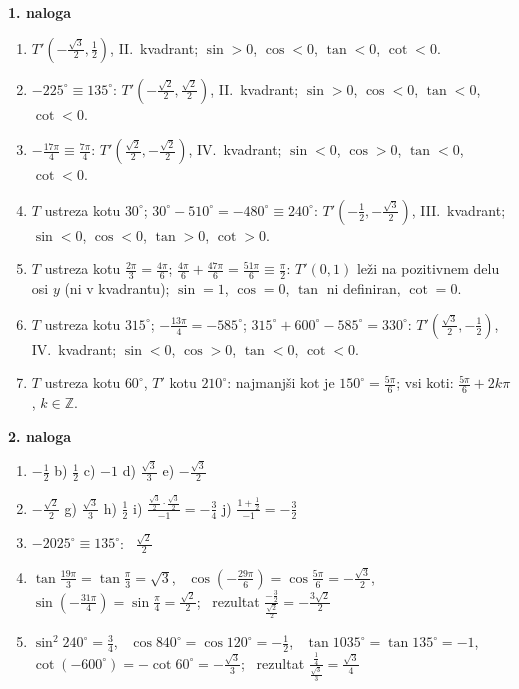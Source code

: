 \documentclass[11pt,a4paper]{article}
\begin{document}
\textbf{1. naloga}
\begin{enumerate}[label=\alph*)]
  \item $T'\!\left(-\frac{\sqrt3}{2}, \frac12\right)$, II.\ kvadrant; $\sin>0$, $\cos<0$, $\tan<0$, $\cot<0$.
  \item $-225^\circ \equiv 135^\circ$: $T'\!\left(-\frac{\sqrt2}{2}, \frac{\sqrt2}{2}\right)$, II.\ kvadrant; $\sin>0$, $\cos<0$, $\tan<0$, $\cot<0$.
  \item $-\frac{17\pi}{4} \equiv \frac{7\pi}{4}$: $T'\!\left(\frac{\sqrt2}{2}, -\frac{\sqrt2}{2}\right)$, IV.\ kvadrant; $\sin<0$, $\cos>0$, $\tan<0$, $\cot<0$.
  \item $T$ ustreza kotu $30^\circ$; $30^\circ - 510^\circ = -480^\circ \equiv 240^\circ$:
        $T'\!\left(-\frac12, -\frac{\sqrt3}{2}\right)$, III.\ kvadrant; $\sin<0$, $\cos<0$, $\tan>0$, $\cot>0$.
  \item $T$ ustreza kotu $\frac{2\pi}{3}=\frac{4\pi}{6}$; $\frac{4\pi}{6}+\frac{47\pi}{6} = \frac{51\pi}{6} \equiv \frac{\pi}{2}$:
        $T'(0,1)$ leži na pozitivnem delu osi $y$ (ni v kvadrantu); $\sin=1$, $\cos=0$, $\tan$ ni definiran, $\cot=0$.
  \item $T$ ustreza kotu $315^\circ$; $-\frac{13\pi}{4} = -585^\circ$; $315^\circ+600^\circ-585^\circ = 330^\circ$:
        $T'\!\left(\frac{\sqrt3}{2}, -\frac12\right)$, IV.\ kvadrant; $\sin<0$, $\cos>0$, $\tan<0$, $\cot<0$.
  \item $T$ ustreza kotu $60^\circ$, $T'$ kotu $210^\circ$: najmanjši kot je $150^\circ = \frac{5\pi}{6}$;
        vsi koti: $\frac{5\pi}{6} + 2k\pi$, $k\in\mathbb{Z}$.
\end{enumerate}

\textbf{2. naloga}
\begin{enumerate}[label=\alph*)]
  \item $-\frac12$ \quad b) $\frac12$ \quad c) $-1$ \quad d) $\frac{\sqrt3}{3}$ \quad e) $-\frac{\sqrt3}{2}$
  \setcounter{enumii}{5}
  \item $-\frac{\sqrt2}{2}$ \quad g) $\frac{\sqrt3}{3}$ \quad h) $\frac12$ \quad
        i) $\frac{\frac{\sqrt3}{2}\cdot\frac{\sqrt3}{2}}{-1} = -\frac34$ \quad
        j) $\frac{1+\frac12}{-1} = -\frac32$
  \setcounter{enumii}{10}
  \item $-2025^\circ \equiv 135^\circ$: \ $\frac{\sqrt2}{2}$
  \item $\tan\frac{19\pi}{3}=\tan\frac{\pi}{3}=\sqrt3$, \ $\cos\left(-\frac{29\pi}{6}\right)=\cos\frac{5\pi}{6}=-\frac{\sqrt3}{2}$,
        \ $\sin\left(-\frac{31\pi}{4}\right)=\sin\frac{\pi}{4}=\frac{\sqrt2}{2}$; \
        rezultat $\frac{-\frac32}{\frac{\sqrt2}{2}} = -\frac{3\sqrt2}{2}$
  \item $\sin^2 240^\circ=\frac34$, \ $\cos 840^\circ=\cos120^\circ=-\frac12$, \ $\tan1035^\circ=\tan135^\circ=-1$,
        \ $\cot(-600^\circ)=-\cot60^\circ=-\frac{\sqrt3}{3}$; \ rezultat $\frac{\frac14}{\frac{\sqrt3}{3}} = \frac{\sqrt3}{4}$
\end{enumerate}
\end{document}
